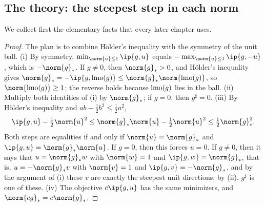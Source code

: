 \begin{refsection}
\section{The theory: the steepest step in each norm}\label{sec:steepest:maps}

We collect first the elementary facts that every later chapter uses.


\begin{proof}
The plan is to combine Hölder's inequality with the symmetry of the unit ball. (i) By symmetry, $\min_{\norm{u}\le1}\ip{g,u}$ equals $-\max_{\norm{u}\le1}\ip{g,-u}$, which is $-\norm{g}_*$. If $g\ne0$, then $\norm{g}_*>0$, and Hölder's inequality gives $\norm{g}_*=-\ip{g,\lmo(g)}\le\norm{g}_*\norm{\lmo(g)}$, so $\norm{\lmo(g)}\ge1$; the reverse holds because $\operatorname{lmo}(g)$ lies in the ball. (ii) Multiply both identities of (i) by $\norm{g}_*$; if $g=0$, then $g^\sharp=0$. (iii) By Hölder's inequality and $ab-\frac12b^2\le\frac12a^2$,
\[
  \ip{g,u}-\tfrac12\norm{u}^2\le\norm{g}_*\norm{u}-\tfrac12\norm{u}^2\le\tfrac12\norm{g}_*^2 .
\]
Both steps are equalities if and only if $\norm{u}=\norm{g}_*$ and $\ip{g,u}=\norm{g}_*\norm{u}$. If $g=0$, then this forces $u=0$. If $g\ne0$, then it says that $u=\norm{g}_*w$ with $\norm{w}=1$ and $\ip{g,w}=\norm{g}_*$, that is, $u=-\norm{g}_*v$ with $\norm{v}=1$ and $\ip{g,v}=-\norm{g}_*$, and by the argument of (i) these $v$ are exactly the steepest unit directions; by (ii), $g^\sharp$ is one of these. (iv) The objective $c\ip{g,u}$ has the same minimizers, and $\norm{cg}_*=c\norm{g}_*$.
\end{proof}


\end{refsection}
